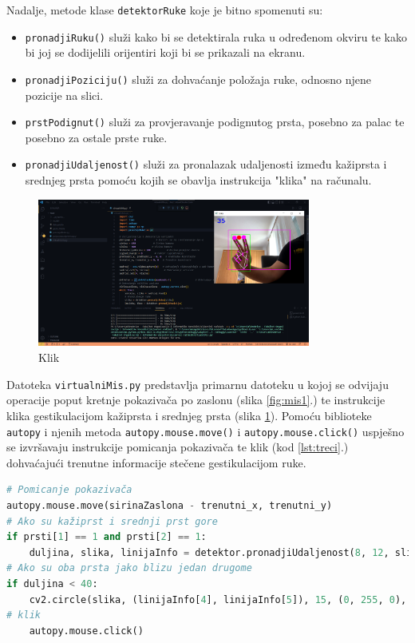 \documentclass[]{foi} %
\begin{document}
\newpage
Nadalje, metode klase \texttt{detektorRuke} koje je bitno spomenuti su:

\begin{itemize}
    \item \texttt{pronadjiRuku()} služi kako bi se detektirala ruka u određenom okviru te kako bi joj se dodijelili orijentiri koji bi se prikazali na ekranu.
    \item \texttt{pronadjiPoziciju()} služi za dohvaćanje položaja ruke, odnosno njene pozicije na slici.
    \item \texttt{prstPodignut()} služi za provjeravanje podignutog prsta, posebno za palac te posebno za ostale prste ruke.
    \item \texttt{pronadjiUdaljenost()} služi za pronalazak udaljenosti između kažiprsta i srednjeg prsta pomoću kojih se obavlja instrukcija "klika" na računalu.
\end{itemize}

\begin{figure}[!ht]
    \centering
    \includegraphics[width=0.8\textwidth]{slike/mis2.png}
    \caption{Klik}
    \label{fig:mis2}
\end{figure}

Datoteka \texttt{virtualniMis.py} predstavlja primarnu datoteku u kojoj se odvijaju operacije poput kretnje pokazivača po zaslonu (slika \ref{fig:mis1}.) te instrukcije klika gestikulacijom kažiprsta i srednjeg prsta (slika \ref{fig:mis2}).
Pomoću biblioteke \texttt{autopy} i njenih metoda \texttt{autopy.mouse.move()} i \texttt{autopy.mouse.click()} uspješno se izvršavaju instrukcije pomicanja pokazivača te klik (kod \ref{lst:treci}.) dohvaćajući trenutne informacije stečene gestikulacijom ruke.

\begin{lstlisting}[language=Python, caption={[Pomicanje pokazivača i klik] Pomicanje pokazivača i klik}, label=lst:treci]
# Pomicanje pokazivača
autopy.mouse.move(sirinaZaslona - trenutni_x, trenutni_y)
# Ako su kažiprst i srednji prst gore
if prsti[1] == 1 and prsti[2] == 1:     
    duljina, slika, linijaInfo = detektor.pronadjiUdaljenost(8, 12, slika)
# Ako su oba prsta jako blizu jedan drugome
if duljina < 40:
    cv2.circle(slika, (linijaInfo[4], linijaInfo[5]), 15, (0, 255, 0), cv2.FILLED)
# klik
    autopy.mouse.click()
\end{lstlisting}
\end{document}
